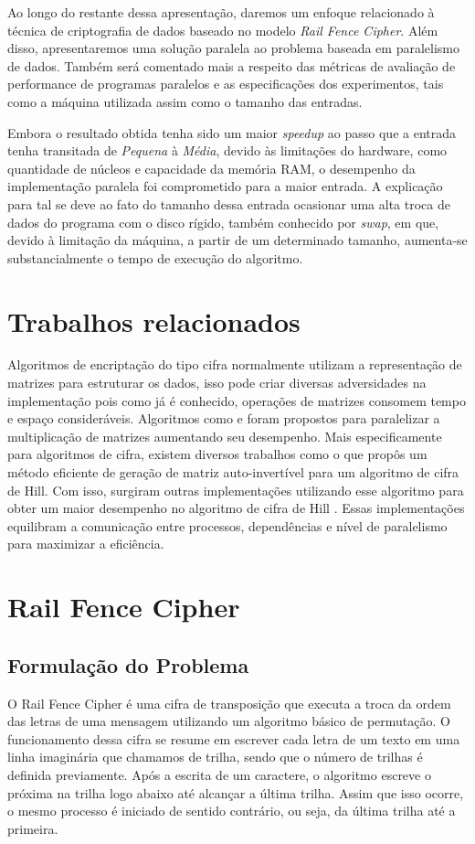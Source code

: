 \documentclass[letterpaper, 10 pt, conference]{ieeeconf}  %
\begin{document}
Ao longo do restante dessa apresentação, daremos um enfoque relacionado à técnica de criptografia de dados baseado no modelo \textit{Rail Fence Cipher}. Além disso, apresentaremos uma solução paralela ao problema baseada em paralelismo de dados. Também será comentado mais a respeito das métricas de avaliação de performance de programas paralelos e as especificações dos experimentos, tais como a máquina utilizada assim como o tamanho das entradas.

Embora o resultado obtida tenha sido um maior \textit{speedup} ao passo que a entrada tenha transitada de \textit{Pequena} à \textit{Média}, devido às limitações do hardware, como quantidade de núcleos e capacidade da memória RAM, o desempenho da implementação paralela foi comprometido para a maior entrada. A explicação para tal se deve ao fato do tamanho dessa entrada ocasionar uma alta troca de dados do programa com o disco rígido, também conhecido por \textit{swap}, em que, devido à limitação da máquina, a partir de um determinado tamanho, aumenta-se substancialmente o tempo de execução do algoritmo.

\section{Trabalhos relacionados}
Algoritmos de encriptação do tipo cifra normalmente utilizam a representação de matrizes para estruturar os dados, isso pode criar diversas adversidades na implementação pois como já é conhecido,  operações de matrizes consomem tempo e espaço consideráveis. Algoritmos como \cite{c8} e \cite{c9} foram propostos para paralelizar a multiplicação de matrizes aumentando seu desempenho. Mais especificamente para algoritmos de cifra, existem diversos trabalhos como o \cite{c10} que propôs um método eficiente de geração de matriz auto-invertível para um algoritmo de cifra de Hill. Com isso, surgiram outras implementações utilizando esse algoritmo para obter um maior desempenho no algoritmo de cifra de Hill \cite{c7}. Essas implementações equilibram a comunicação entre processos, dependências e nível de paralelismo para maximizar a eficiência.

\section{Rail Fence Cipher}

\subsection{Formulação do Problema}
O Rail Fence Cipher é uma cifra de transposição que executa a troca da ordem das letras de uma mensagem utilizando um algoritmo básico de permutação. O funcionamento dessa cifra se resume em escrever cada letra de um texto em uma linha imaginária que chamamos de trilha, sendo que o número de trilhas é definida previamente. Após a escrita de um caractere, o algoritmo escreve o próxima na trilha logo abaixo até alcançar a última trilha. Assim que isso ocorre, o mesmo processo é iniciado de sentido contrário, ou seja, da última trilha até a primeira.
\end{document}
